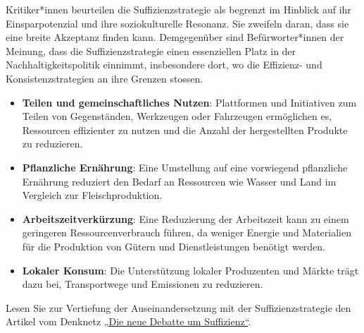 \documentclass[
  nswissgerman,
  a4paper,
  DIV=11,
  numbers=noendperiod,
  oneside,
  openany]{scrreprt}
\providecommand{\tightlist}{%
  \setlength{\itemsep}{0pt}\setlength{\parskip}{0pt}}
\begin{document}
Kritiker*innen beurteilen die Suffizienzstrategie als begrenzt im
Hinblick auf ihr Einsparpotenzial und ihre soziokulturelle Resonanz. Sie
zweifeln daran, dass sie eine breite Akzeptanz finden kann. Demgegenüber
sind Befürworter*innen der Meinung, dass die Suffizienzstrategie einen
essenziellen Platz in der Nachhaltigkeitspolitik einnimmt, insbesondere
dort, wo die Effizienz- und Konsistenzstrategien an ihre Grenzen
stossen.

\begin{tcolorbox}[enhanced jigsaw, arc=.35mm, bottomrule=.15mm, bottomtitle=1mm, breakable, colback=white, colbacktitle=quarto-callout-tip-color!10!white, colframe=quarto-callout-tip-color-frame, coltitle=black, left=2mm, leftrule=.75mm, opacityback=0, opacitybacktitle=0.6, rightrule=.15mm, title={Beispiele Suffizienzstrategie}, titlerule=0mm, toprule=.15mm, toptitle=1mm]

\begin{itemize}
\tightlist
\item
  \textbf{Teilen und gemeinschaftliches Nutzen}: Plattformen und
  Initiativen zum Teilen von Gegenständen, Werkzeugen oder Fahrzeugen
  ermöglichen es, Ressourcen effizienter zu nutzen und die Anzahl der
  hergestellten Produkte zu reduzieren.
\item
  \textbf{Pflanzliche Ernährung}: Eine Umstellung auf eine vorwiegend
  pflanzliche Ernährung reduziert den Bedarf an Ressourcen wie Wasser
  und Land im Vergleich zur Fleischproduktion.
\item
  \textbf{Arbeitszeitverkürzung}: Eine Reduzierung der Arbeitszeit kann
  zu einem geringeren Ressourcenverbrauch führen, da weniger Energie und
  Materialien für die Produktion von Gütern und Dienstleistungen
  benötigt werden.
\item
  \textbf{Lokaler Konsum}: Die Unterstützung lokaler Produzenten und
  Märkte trägt dazu bei, Transportwege und Emissionen zu reduzieren.
\end{itemize}

\end{tcolorbox}

\begin{tcolorbox}[enhanced jigsaw, arc=.35mm, bottomrule=.15mm, bottomtitle=1mm, breakable, colback=white, colbacktitle=quarto-callout-caution-color!10!white, colframe=quarto-callout-caution-color-frame, coltitle=black, left=2mm, leftrule=.75mm, opacityback=0, opacitybacktitle=0.6, rightrule=.15mm, title={Weiterführende Literatur}, titlerule=0mm, toprule=.15mm, toptitle=1mm]

Lesen Sie zur Vertiefung der Auseinandersetzung mit der
Suffizienzstrategie den Artikel vom Denknetz
\href{https://ilias.unibe.ch/go/file/3803485}{„Die neue Debatte um
Suffizienz``}.

\end{tcolorbox}
\end{document}

